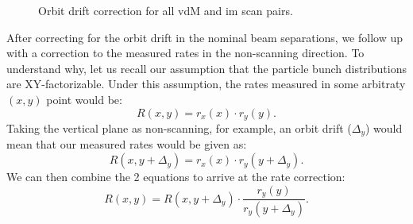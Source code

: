 \begin{itemize}
	\begin{figure}[!htb]
		\centering
		\caption[Orbit drift correction summary]{Orbit drift correction for all vdM and im scan pairs.}
		\label{fig:linear_orbit_drift_correction}
	\end{figure}

	After correcting for the orbit drift in the nominal beam separations, we follow up with a correction to the measured rates in the non-scanning direction. To understand why, let us recall our assumption that the particle bunch distributions are XY-factorizable. Under this assumption, the rates measured in some arbitraty $(x, y)$ point would be:
	\begin{equation}
		R\left( x, y \right) = r_x(x) \cdot r_y(y).
	\end{equation}
	Taking the vertical plane as non-scanning, for example, an orbit drift ($\Delta_y$) would mean that our measured rates would be given as:
	\begin{equation}
		R\left( x, y + \Delta_y \right) = r_x(x) \cdot r_y(y + \Delta_y).
	\end{equation}
	We can then combine the 2 equations to arrive at the rate correction:
	\begin{equation}
		R\left( x, y\right) = R\left( x, y + \Delta_y \right) \cdot \frac{r_y(y)}{r_y(y + \Delta_y)}.
	\end{equation}


\end{itemize}
